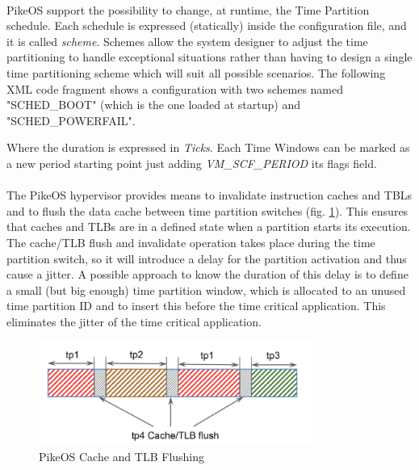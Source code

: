 \paragraph{} PikeOS support the possibility to change, at runtime, the Time Partition schedule. Each schedule is expressed (statically) inside the configuration file, and it is called \emph{scheme}. Schemes allow the system designer to adjust the time partitioning to handle exceptional situations rather than having to design a single time partitioning scheme which will suit all possible scenarios. The following XML code fragment shows a configuration with two schemes named "SCHED\_BOOT" (which is the one loaded at startup) and "SCHED\_POWERFAIL".


\par Where the duration is expressed in \emph{Ticks}. Each Time Windows can be marked as a new period starting point just adding \emph{VM\_SCF\_PERIOD} its flags field.

\paragraph{} The PikeOS hypervisor provides means to invalidate instruction caches and TBLs and to flush the data cache between time partition switches (fig. \ref{fig:PikeosCacheFlush}). This ensures that caches and TLBs are in a defined state when a partition starts its execution. The cache/TLB flush and invalidate operation takes place during the time partition switch, so it will introduce a delay for the partition activation and thus cause a jitter. A possible approach to know the duration \cite{PikeosScheduling} of this delay is to define a small (but big enough) time partition window, which is allocated to an unused time partition ID and to insert this before the time critical application. This eliminates the jitter of the time critical application.

\begin{figure}[htbp] 
\centering    
\includegraphics[width=0.8\textwidth]{PikeosCacheFlush}
\caption{PikeOS Cache and TLB Flushing}
\label{fig:PikeosCacheFlush}
\end{figure}

